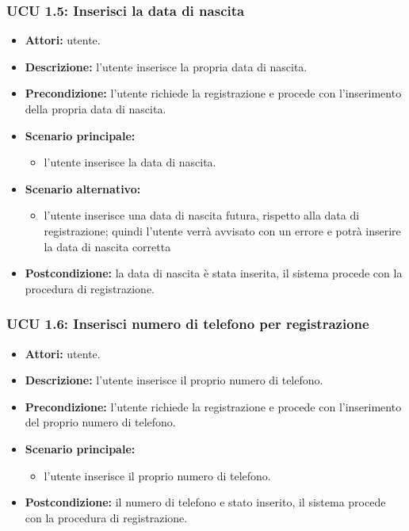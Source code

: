 \subsubsection{UCU 1.5: Inserisci la data di nascita}
\begin{itemize}
	\item \textbf{Attori: } utente.
	\item \textbf{Descrizione: } l'utente inserisce la propria data di nascita.
	\item \textbf{Precondizione: } l'utente richiede la registrazione e procede con l'inserimento della propria data di nascita.
	\item \textbf{Scenario principale:}
	\begin{itemize}
		\item l'utente inserisce la data di nascita.
	\end{itemize}
	\item \textbf{Scenario alternativo:}
	\begin{itemize}
    \item l'utente inserisce una data di nascita futura, rispetto alla data di registrazione; quindi l'utente verrà avvisato con un errore e potrà inserire la data di nascita corretta
    \end{itemize}
	\item \textbf{Postcondizione: } la data di nascita è stata inserita, il sistema procede con la procedura di registrazione.
\end{itemize}

\subsubsection{UCU 1.6: Inserisci numero di telefono per registrazione}
\begin{itemize}
	\item \textbf{Attori: } utente.
	\item \textbf{Descrizione: } l'utente inserisce il proprio numero di telefono.
	\item \textbf{Precondizione: } l'utente richiede la registrazione e procede con l'inserimento del proprio numero di telefono.
	\item \textbf{Scenario principale:}
	\begin{itemize}
		\item l'utente inserisce il proprio numero di telefono.
	\end{itemize}
\item \textbf{Postcondizione: } il numero di telefono e stato inserito, il sistema procede con la procedura di registrazione.
\end{itemize}

